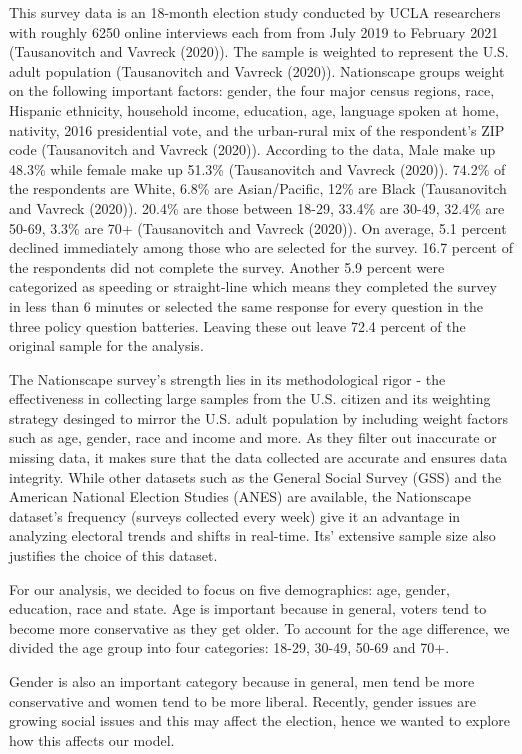 \documentclass[
  letterpaper,
  DIV=11,
  numbers=noendperiod]{scrartcl}
\begin{document}
This survey data is an 18-month election study conducted by UCLA
researchers with roughly 6250 online interviews each from from July 2019
to February 2021 (Tausanovitch and Vavreck (2020)). The sample is
weighted to represent the U.S. adult population (Tausanovitch and
Vavreck (2020)). Nationscape groups weight on the following important
factors: gender, the four major census regions, race, Hispanic
ethnicity, household income, education, age, language spoken at home,
nativity, 2016 presidential vote, and the urban-rural mix of the
respondent's ZIP code (Tausanovitch and Vavreck (2020)). According to
the data, Male make up 48.3\% while female make up 51.3\% (Tausanovitch
and Vavreck (2020)). 74.2\% of the respondents are White, 6.8\% are
Asian/Pacific, 12\% are Black (Tausanovitch and Vavreck (2020)). 20.4\%
are those between 18-29, 33.4\% are 30-49, 32.4\% are 50-69, 3.3\% are
70+ (Tausanovitch and Vavreck (2020)). On average, 5.1 percent declined
immediately among those who are selected for the survey. 16.7 percent of
the respondents did not complete the survey. Another 5.9 percent were
categorized as speeding or straight-line which means they completed the
survey in less than 6 minutes or selected the same response for every
question in the three policy question batteries. Leaving these out leave
72.4 percent of the original sample for the analysis.

The Nationscape survey's strength lies in its methodological rigor - the
effectiveness in collecting large samples from the U.S. citizen and its
weighting strategy desinged to mirror the U.S. adult population by
including weight factors such as age, gender, race and income and more.
As they filter out inaccurate or missing data, it makes sure that the
data collected are accurate and ensures data integrity. While other
datasets such as the General Social Survey (GSS) and the American
National Election Studies (ANES) are available, the Nationscape
dataset's frequency (surveys collected every week) give it an advantage
in analyzing electoral trends and shifts in real-time. Its' extensive
sample size also justifies the choice of this dataset.

For our analysis, we decided to focus on five demographics: age, gender,
education, race and state. Age is important because in general, voters
tend to become more conservative as they get older. To account for the
age difference, we divided the age group into four categories: 18-29,
30-49, 50-69 and 70+.

Gender is also an important category because in general, men tend be
more conservative and women tend to be more liberal. Recently, gender
issues are growing social issues and this may affect the election, hence
we wanted to explore how this affects our model.
\end{document}
